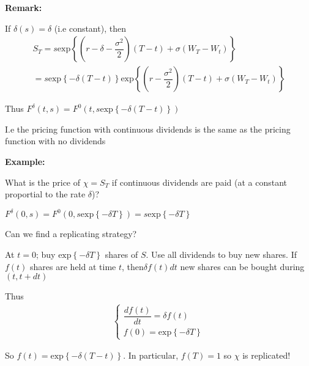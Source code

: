 \par\bigskip
\noindent\textbf{Remark:}\par
\noindent If $\delta(s) =\delta$ (i.e constant), then
\begin{equation*}
  \begin{gathered}
    S_T = s\text{exp}\left\{\left(r-\delta-\dfrac{\sigma^2}{2}\right)(T-t)+\sigma(W_T-W_t)\right\}\\
    = s\text{exp}\left\{-\delta(T-t)\right\}\text{exp}\left\{\left(r-\dfrac{\sigma^2}{2}\right)(T-t)+\sigma(W_T-W_t)\right\}
  \end{gathered}
\end{equation*}\par
\noindent Thus $F^\delta(t,s) = F^0(t,s\text{exp}\left\{-\delta(T-t)\right\})$\par
\noindent I.e the pricing function with continuous dividends is the same as the pricing function with no dividends
\par\bigskip
\noindent\textbf{Example:}\par
\noindent What is the price of $\chi =S_T$ if continuous dividends are paid (at a constant proportial to the rate $\delta$)?\par
\noindent $F^\delta(0,s) = F^0(0,s\text{exp}\left\{-\delta T\right\}) =s\text{exp}\left\{-\delta T\right\}$
\par\bigskip
\noindent Can we find a replicating strategy?\par
\noindent At $t=0$; buy $\text{exp}\left\{-\delta T\right\}$ shares of $S$. Use all dividends to buy new shares. If $f(t)$ shares are held at time $t$, then$\delta f(t)dt$ new shares can be bought during $(t,t+dt)$\par
\noindent Thus
\begin{equation*}
  \begin{gathered}
    \begin{cases}
      \dfrac{df(t)}{dt} = \delta f(t)\\
      f(0) = \text{exp}\left\{-\delta T\right\}
    \end{cases}
  \end{gathered}
\end{equation*}\par
\noindent So $f(t) = \text{exp}\left\{-\delta(T-t)\right\}$. In particular, $f(T) = 1$ so $\chi$ is replicated!
